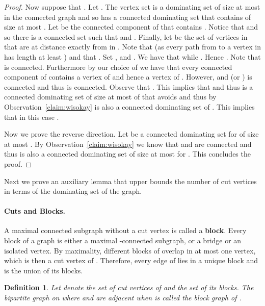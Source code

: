 \documentclass[11pt]{article}
\newtheorem{definition}{Definition}
\begin{document}
\begin{proof}
Now suppose that . Let . The vertex set  is a dominating set of size at most  in the connected graph  and so  has a connected dominating set  that contains  of size at most . Let  be the connected component of  that contains . Notice that  and so there is a connected set  such that  and . Finally, let  be the set of vertices in  that are at distance exactly  from  in . Note that  (as every path from  to  a vertex in  has length at least ) and that . Set 
, and . We have that  while . Hence .  Note that  is connected. Furthermore by our choice of 
 we have that every connected component of  contains a vertex of 
 and hence a vertex of . However,  and  (or )  is connected and thus  
 is connected.  Observe that . This implies that 
 and thus  is a connected dominating set of size at most  of  that avoids  and thus by Observation~\ref{claim:wisokay} is also a connected dominating set of . This implies that in this case .   













Now we prove the reverse direction. Let    be a connected dominating set for  of size at most .  By Observation~\ref{claim:wisokay} we know that  and  are connected and thus  is also a connected dominating set of size at most  for . This concludes the proof.  
\end{proof}











 Next we prove an auxiliary lemma that upper bounds the number of cut vertices in terms of the dominating set of the graph. 
 
 \paragraph{Cuts and Blocks.} 
 A maximal connected subgraph without a cut vertex is called a \textbf{block}. Every block of a graph  is either a maximal -connected subgraph, or a bridge or an isolated vertex. By maximality, different blocks of  overlap in at most one vertex, which is then a cut vertex of . Therefore, every edge of  lies in a unique block and  is the union of its blocks.

\begin{definition} Let  denote the set of cut vertices of  and  the set of its blocks. The bipartite graph on  where  and  are adjacent when  is called the block graph of .
\end{definition}
\end{document}
